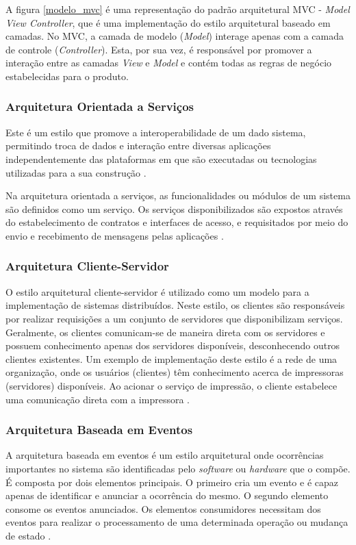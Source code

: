 A figura \ref{modelo_mvc} é uma representação do padrão arquitetural MVC - \textit{Model View Controller}, que é uma implementação do estilo arquitetural baseado em camadas. No MVC, a camada de modelo (\textit{Model}) interage apenas com a camada de controle (\textit{Controller}). Esta, por sua vez, é responsável por promover a interação entre as camadas \textit{View} e \textit{Model} e contém todas as regras de negócio estabelecidas para o produto.

\subsubsection{Arquitetura Orientada a Serviços}

Este é um estilo que promove a interoperabilidade de um dado sistema, permitindo troca de dados e interação entre diversas aplicações independentemente das plataformas em que são executadas ou tecnologias utilizadas para a sua construção \cite{oqueesoa_2010}.

Na arquitetura orientada a serviços, as funcionalidades ou módulos de um sistema são definidos como um serviço. Os serviços disponibilizados são expostos através do estabelecimento de contratos e interfaces de acesso, e requisitados por meio do envio e recebimento de mensagens pelas aplicações \cite{oqueesoa_2010}.

\subsubsection{Arquitetura Cliente-Servidor}
O estilo arquitetural cliente-servidor é utilizado como um modelo para a implementação de sistemas distribuídos. Neste estilo, os clientes são responsáveis por realizar requisições a um conjunto de servidores que disponibilizam serviços. Geralmente, os clientes comunicam-se de maneira direta com os servidores e possuem conhecimento apenas dos servidores disponíveis, desconhecendo outros clientes existentes. Um exemplo de implementação deste estilo é a rede de uma organização, onde os usuários (clientes) têm conhecimento acerca de impressoras (servidores) disponíveis. Ao acionar o serviço de impressão, o cliente estabelece uma comunicação direta com a impressora \cite{sommerville2008engenharia}.

\subsubsection{Arquitetura Baseada em Eventos}
A arquitetura baseada em eventos é um estilo arquitetural onde ocorrências importantes no sistema são identificadas pelo \textit{software} ou \textit{hardware} que o compõe. É composta por dois elementos principais. O primeiro cria um evento e é capaz apenas de identificar e anunciar a ocorrência do mesmo. O segundo elemento consome os eventos anunciados. Os elementos consumidores necessitam dos eventos para realizar o processamento de uma determinada operação ou mudança de estado \cite{rouse}.


